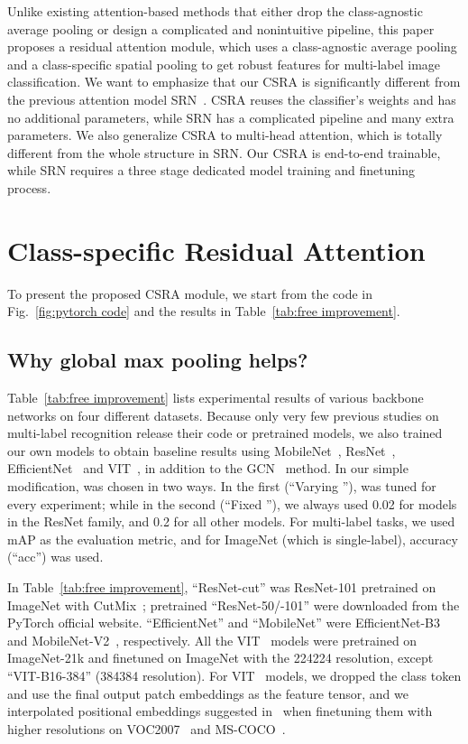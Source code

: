 \documentclass[10pt,twocolumn,letterpaper]{article}
\begin{document}
Unlike existing attention-based methods that either drop the class-agnostic average pooling or design a complicated and nonintuitive pipeline, this paper proposes a residual attention module, which uses a class-agnostic average pooling and a class-specific spatial pooling to get robust features for multi-label image classification. We want to emphasize that our CSRA is significantly different from the previous attention model SRN~\cite{2017_CVPR_SRN}. CSRA reuses the classifier's weights and has no additional parameters, while SRN has a complicated pipeline and many extra parameters. We also generalize CSRA to multi-head attention, which is totally different from the whole structure in SRN. Our CSRA is end-to-end trainable, while SRN requires a three stage dedicated model training and finetuning process.

\section{Class-specific Residual Attention}

To present the proposed CSRA module, we start from the code in Fig.~\ref{fig:pytorch code} and the results in Table~\ref{tab:free improvement}.

\subsection{Why global max pooling helps?}

Table~\ref{tab:free improvement} lists experimental results of various backbone networks on four different datasets. Because only very few previous studies on multi-label recognition release their code or pretrained models, we also trained our own models to obtain baseline results using MobileNet~\cite{MobileNet}, ResNet~\cite{ResNet}, EfficientNet~\cite{Efficientnet} and VIT~\cite{VIT}, in addition to the GCN~\cite{2019_CVPR_GCN} method. In our simple modification,  was chosen in two ways. In the first (``Varying ''),  was tuned for every experiment; while in the second (``Fixed ''), we always used 0.02 for models in the ResNet family, and 0.2 for all other models. For multi-label tasks, we used mAP as the evaluation metric, and for ImageNet (which is single-label), accuracy (``acc'') was used.

In Table~\ref{tab:free improvement}, ``ResNet-cut'' was ResNet-101 pretrained on ImageNet with CutMix~\cite{cutmix}; pretrained ``ResNet-50/-101'' were downloaded from the PyTorch official website. ``EfficientNet'' and ``MobileNet'' were EfficientNet-B3~\cite{Efficientnet} and MobileNet-V2~\cite{MobileNet}, respectively. All the VIT~\cite{VIT} models were pretrained on ImageNet-21k and finetuned on ImageNet with the 224224 resolution, except ``VIT-B16-384'' (384384 resolution). For VIT~\cite{VIT} models, we dropped the class token and use the final output patch embeddings as the feature tensor, and we interpolated positional embeddings suggested in~\cite{VIT} when finetuning them with higher resolutions on VOC2007~\cite{VOC} and MS-COCO~\cite{MSCOCO}.
\end{document}
